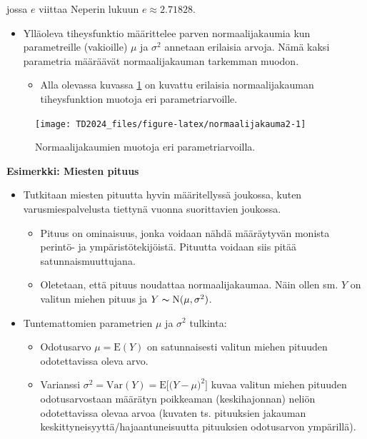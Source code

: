 \documentclass[
]{book}
\providecommand{\tightlist}{%
  \setlength{\itemsep}{0pt}\setlength{\parskip}{0pt}}
\begin{document}
jossa \(e\) viittaa Neperin lukuun \(e \approx 2.71828\).

\begin{itemize}
\tightlist
\item
  Ylläoleva tiheysfunktio määrittelee parven normaalijakaumia kun parametreille (vakioille) \(\mu\) ja \(\sigma^2\) annetaan erilaisia arvoja. Nämä kaksi parametria määräävät normaalijakauman tarkemman muodon.

  \begin{itemize}
  \tightlist
  \item
    Alla olevassa kuvassa \ref{fig:normaalijakauma2} on kuvattu erilaisia normaalijakauman tiheysfunktion muotoja eri parametriarvoille.
  \end{itemize}
\end{itemize}

\begin{figure}

{\centering \texttt{[image: TD2024\_files/figure-latex/normaalijakauma2-1]} 

}

\caption{Normaalijakaumien muotoja eri parametriarvoilla.}\label{fig:normaalijakauma2}
\end{figure}

\begin{eblock}{}

\textbf{Esimerkki: Miesten pituus}

\begin{itemize}
\tightlist
\item
  Tutkitaan miesten pituutta hyvin määritellyssä joukossa, kuten varusmiespalvelusta tiettynä vuonna suorittavien joukossa.

  \begin{itemize}
  \tightlist
  \item
    Pituus on ominaisuus, jonka voidaan nähdä määräytyvän monista perintö- ja ympäristötekijöistä. Pituutta voidaan siis pitää satunnaismuuttujana.
  \item
    Oletetaan, että pituus noudattaa normaalijakaumaa. Näin ollen sm. \(Y\) on valitun miehen pituus ja \(Y \thicksim \text{N}(\mu, \sigma^2)\).
  \end{itemize}
\item
  Tuntemattomien parametrien \(\mu\) ja \(\sigma^2\) tulkinta:

  \begin{itemize}
  \tightlist
  \item
    Odotusarvo \(\mu = \text{E}(Y)\) on satunnaisesti valitun miehen pituuden odotettavissa oleva arvo.
  \item
    Varianssi \(\sigma^2 = \mathrm{Var}(Y) = \text{E} \Big[\Big(Y- \mu \Big)^2 \Big]\) kuvaa valitun miehen pituuden odotusarvostaan määrätyn poikkeaman (keskihajonnan) neliön odotettavissa olevaa arvoa (kuvaten ts. pituuksien jakauman keskittyneisyyttä/hajaantuneisuutta pituuksien odotusarvon ympärillä).
  \end{itemize}
\end{itemize}

\end{eblock}
\end{document}
